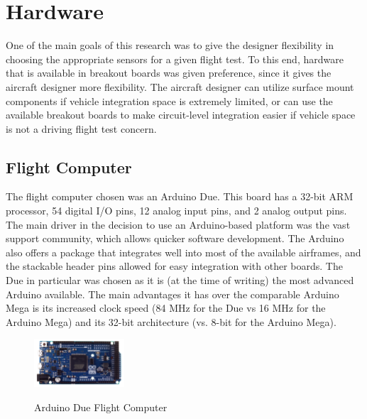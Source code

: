 \chapter{Hardware}
\label{hardware}
One of the main goals of this research was to give the designer flexibility in choosing the appropriate sensors for a given flight test. To this end, hardware that is available in breakout boards was given preference, since it gives the aircraft designer more flexibility. The aircraft designer can utilize surface mount components if vehicle integration space is extremely limited, or can use the available breakout boards to make circuit-level integration easier if vehicle space is not a driving flight test concern.

\section{Flight Computer}
The flight computer chosen was an Arduino Due. This board has a 32-bit ARM processor, 54 digital I/O pins, 12 analog input pins, and 2 analog output pins. The main driver in the decision to use an Arduino-based platform was the vast support community, which allows quicker software development. The Arduino also offers a package that integrates well into most of the available airframes, and the stackable header pins allowed for easy integration with other boards. The Due in particular was chosen as it is (at the time of writing) the most advanced Arduino available. The main advantages it has over the comparable Arduino Mega is its increased clock speed (84 MHz for the Due\cite{Atmel2012} vs 16 MHz for the Arduino Mega\cite{Atmel2012atmega}) and its 32-bit architecture (vs. 8-bit for the Arduino Mega).
\begin{figure}[H]
  \centering
    \includegraphics[width=0.3\textwidth]{figures/arduinoDue.jpg}\  \caption{Arduino Due Flight Computer} \label{arduinoPicture}
\end{figure}

